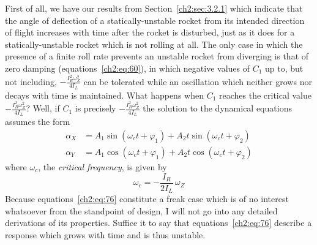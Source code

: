 First of all, we have our results from Section~\ref{ch2:sec:3.2.1} which
indicate that the angle of deflection of a statically-unstable rocket from its
intended direction of flight increases with time after the rocket is
disturbed, just as it does for a statically-unstable rocket which is not
rolling at all. The only case in which the presence of a finite roll rate
prevents an unstable rocket from diverging is that of zero damping
(equations~\eqref{ch2:eq:60}), in which negative values of $C_1$ up to, but
not including, $-\frac{I_R^{2}\omega_Z^{2}}{4I_L}$ can be tolerated while an
oscillation which neither grows nor decays with time is maintained. What
happens when $C_1$ reaches the critical value
$-\frac{I_R^{2}\omega_Z^{2}}{4I_L}$? Well, if $C_1$ is precisely
$-\frac{I_R^{2}\omega_Z^{2}}{4I_L}$ the solution to the dynamical equations
assumes the form
\begin{equation}\label{ch2:eq:76}
\begin{aligned}
\alpha_X &= A_1\sin(\omega_c t + \varphi_1) + A_2 t\sin(\omega_c t + \varphi_2)\\
\alpha_Y &= A_1\cos(\omega_c t + \varphi_1) + A_2 t\cos(\omega_c t + \varphi_2)
\end{aligned}
\end{equation}
where $\omega_c$, the \emph{critical frequency}, is given by
\begin{equation*}
\omega_c = -\frac{I_R}{2I_L}\,\omega_Z
\end{equation*}
Because equations~\eqref{ch2:eq:76} constitute a freak case which is of no
interest whatsoever from the standpoint of design, I will not go into any
detailed derivations of its properties. Suffice it to say that
equations~\eqref{ch2:eq:76} describe a response which grows with time and is
thus unstable.

